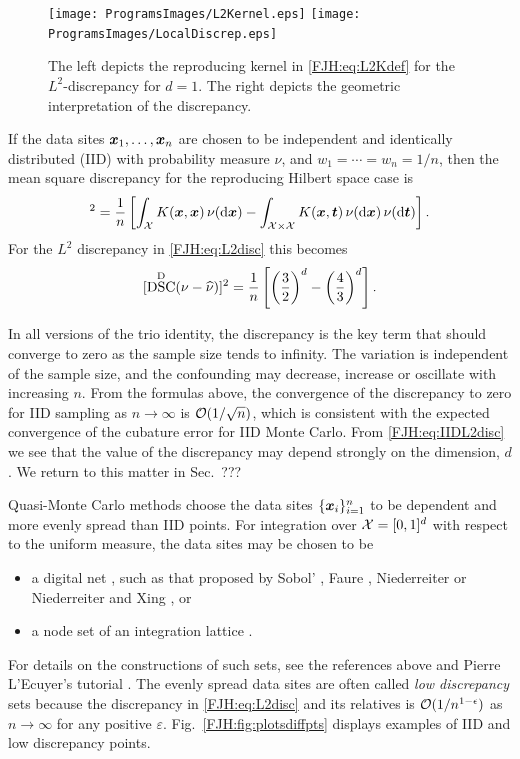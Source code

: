 \documentclass[graybox,footinfo]{svmult}
\DeclareMathOperator{\disc}{DSC}
\begin{document}
\begin{figure}
	\centering
	\texttt{[image: ProgramsImages/L2Kernel.eps]}\qquad
	\texttt{[image: ProgramsImages/LocalDiscrep.eps]}
	\caption{The left depicts the reproducing kernel in \eqref{FJH:eq:L2Kdef} for the 
	$L^2$-discrepancy 
	for $d=1$.  The right depicts the geometric interpretation of the discrepancy.
	\label{FJH:fig:L2ker}}
\end{figure}

If the data sites  ${\boldsymbol{x}}_{1}, \ldots, {\boldsymbol{x}}_{n}$ are chosen to be independent and identically 
distributed (IID) with probability measure $\nu$, and $w_1 = \cdots = w_n = 1/n$, then 
the mean square discrepancy for 
the reproducing Hilbert space case is
\begin{equation*}
[\disc^{\Dt}(\nu - \hnu)]^2  = \frac 1 n \left [ \int_{\cx} K(\bsx,\bsx) \, \nu(\D \bsx) - 
\int_{\cx \times \cx} K(\bsx,\bst) \, \nu(\D \bsx) \, \nu (\D \bst) \right ].
\end{equation*}
For the $L^2$ discrepancy in \eqref{FJH:eq:L2disc} this becomes 
\begin{equation} \label{FJH:eq:IIDL2disc}
[\disc^{\Dt}(\nu - \hnu)]^2  = \frac 1 n \left [ \left(\frac 32\right)^d - 
\left(\frac 43\right)^d \right ].
\end{equation}

In all versions of the trio identity, the discrepancy is the key term that should converge to 
zero as the sample size tends to infinity.  The variation is independent of the sample 
size, and the confounding may decrease, increase or oscillate with increasing $n$.  From 
the formulas above, the convergence of the discrepancy to zero for IID sampling as $n 
\to 
\infty$ is  $\mathcal{O}(1/\sqrt{n})$, which is consistent with the expected convergence of the 
cubature error for IID Monte Carlo.  From \eqref{FJH:eq:IIDL2disc} we see that the 
value of the discrepancy may depend strongly on the dimension, $d$.  We return 
to this matter in Sec.\ ???

Quasi-Monte Carlo methods choose the data sites $\{{\boldsymbol{x}}_i\}_{i=1}^n$ to be dependent 
and more evenly spread than IID points.  For integration over $\mathcal{X} = [0,1]^d$ with 
respect to the uniform measure, the data sites may be chosen to be
\begin{itemize} 
\item a digital net \cite{DicPil10a}, such as that proposed by Sobol' \cite{}, Faure \cite{}, 
Niederreiter \cite{} or Niederreiter and Xing \cite{}, or 
\item a node set of an integration lattice \cite{SloJoe94}.  
\end{itemize}
For details on the 
constructions of such sets, see the references above and Pierre L'Ecuyer's tutorial 
\cite{}.  The evenly spread data sites are often called \emph{low discrepancy} sets 
because the discrepancy in \eqref{FJH:eq:L2disc} and its relatives is 
$\mathcal{O}(1/n^{1-\epsilon})$ as $n \to \infty$ for any positive $\varepsilon$.  Fig.\ 
\ref{FJH:fig:plotsdiffpts} displays examples of IID and low discrepancy points.
\end{document}
